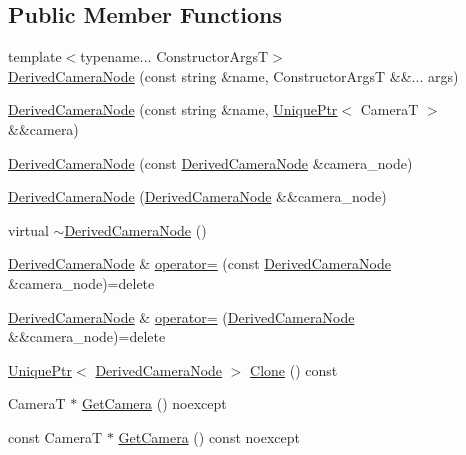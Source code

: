 \subsection*{Public Member Functions}
\begin{DoxyCompactItemize}
\item 
{\footnotesize template$<$typename... Constructor\+ArgsT$>$ }\\\hyperlink{classmage_1_1_derived_camera_node_a782a23d04ba78be88b0f73d9dde4552f}{Derived\+Camera\+Node} (const string \&name, Constructor\+ArgsT \&\&... args)
\item 
\hyperlink{classmage_1_1_derived_camera_node_a629ba0e2c1e6b29e6d45996256c59dbe}{Derived\+Camera\+Node} (const string \&name, \hyperlink{namespacemage_a8c307fbcc33bce9b7f2aa4c26c3b95cf}{Unique\+Ptr}$<$ CameraT $>$ \&\&camera)
\item 
\hyperlink{classmage_1_1_derived_camera_node_ae97b2a006e9e465e2530fdb814e855da}{Derived\+Camera\+Node} (const \hyperlink{classmage_1_1_derived_camera_node}{Derived\+Camera\+Node} \&camera\+\_\+node)
\item 
\hyperlink{classmage_1_1_derived_camera_node_a4c53aa526ee4f81a8d9cf8439650d291}{Derived\+Camera\+Node} (\hyperlink{classmage_1_1_derived_camera_node}{Derived\+Camera\+Node} \&\&camera\+\_\+node)
\item 
virtual \hyperlink{classmage_1_1_derived_camera_node_a74ab678b593c43b6bf95bb7fbfbd4d2d}{$\sim$\+Derived\+Camera\+Node} ()
\item 
\hyperlink{classmage_1_1_derived_camera_node}{Derived\+Camera\+Node} \& \hyperlink{classmage_1_1_derived_camera_node_a827c7952e061c6e12e38fff12585b3b3}{operator=} (const \hyperlink{classmage_1_1_derived_camera_node}{Derived\+Camera\+Node} \&camera\+\_\+node)=delete
\item 
\hyperlink{classmage_1_1_derived_camera_node}{Derived\+Camera\+Node} \& \hyperlink{classmage_1_1_derived_camera_node_a5faeff6f71a85b46d18f5b55e8dcf756}{operator=} (\hyperlink{classmage_1_1_derived_camera_node}{Derived\+Camera\+Node} \&\&camera\+\_\+node)=delete
\item 
\hyperlink{namespacemage_a8c307fbcc33bce9b7f2aa4c26c3b95cf}{Unique\+Ptr}$<$ \hyperlink{classmage_1_1_derived_camera_node}{Derived\+Camera\+Node} $>$ \hyperlink{classmage_1_1_derived_camera_node_a29e597fe2c9e0f37eeab8fec5330d764}{Clone} () const
\item 
CameraT $\ast$ \hyperlink{classmage_1_1_derived_camera_node_a423d9e416aec8ade92d0d2211d40de39}{Get\+Camera} () noexcept
\item 
const CameraT $\ast$ \hyperlink{classmage_1_1_derived_camera_node_aef2db8d343aeebc95c433150e234481a}{Get\+Camera} () const noexcept
\end{DoxyCompactItemize}
